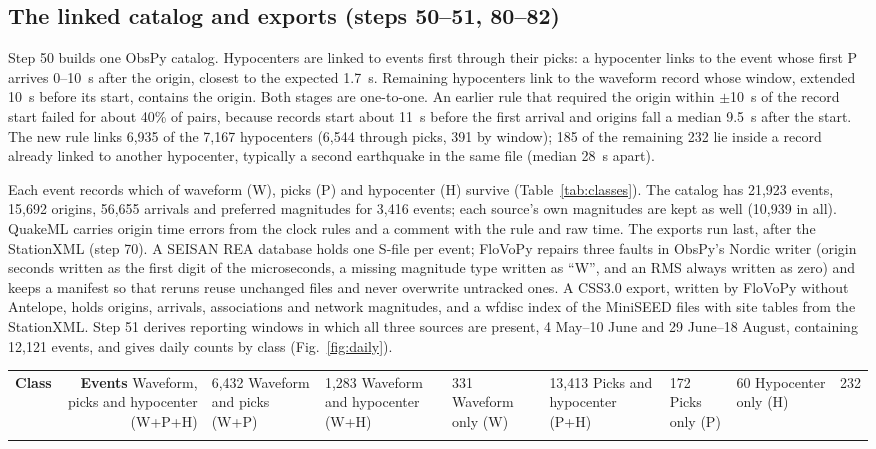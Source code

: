 \documentclass[linenum]{SSA-SRL}
\begin{document}
\subsection{The linked catalog and exports (steps 50--51, 80--82)}

Step 50 builds one ObsPy catalog. Hypocenters are linked to events first through their picks: a hypocenter links to the event whose first P arrives 0--10~s after the origin, closest to the expected 1.7~s. Remaining hypocenters link to the waveform record whose window, extended 10~s before its start, contains the origin. Both stages are one-to-one. An earlier rule that required the origin within $\pm$10~s of the record start failed for about 40\% of pairs, because records start about 11~s before the first arrival and origins fall a median 9.5~s after the start. The new rule links 6,935 of the 7,167 hypocenters (6,544 through picks, 391 by window); 185 of the remaining 232 lie inside a record already linked to another hypocenter, typically a second earthquake in the same file (median 28~s apart).

Each event records which of waveform (W), picks (P) and hypocenter (H) survive (Table~\ref{tab:classes}). The catalog has 21,923 events, 15,692 origins, 56,655 arrivals and preferred magnitudes for 3,416 events; each source's own magnitudes are kept as well (10,939 in all). QuakeML \citep{Schorlemmer_2011} carries origin time errors from the clock rules and a comment with the rule and raw time. The exports run last, after the StationXML (step 70). A SEISAN REA database holds one S-file per event; FloVoPy repairs three faults in ObsPy's Nordic writer (origin seconds written as the first digit of the microseconds, a missing magnitude type written as ``W'', and an RMS always written as zero) and keeps a manifest so that reruns reuse unchanged files and never overwrite untracked ones. A CSS3.0 export, written by FloVoPy without Antelope, holds origins, arrivals, associations and network magnitudes, and a wfdisc index of the MiniSEED files with site tables from the StationXML. Step 51 derives reporting windows in which all three sources are present, 4 May--10 June and 29 June--18 August, containing 12,121 events, and gives daily counts by class (Fig.~\ref{fig:daily}).

\begin{table}
{\begin{tabular*}{\columnwidth}{@{\extracolsep{\fill}}lr@{}}
\toprule
\textbf{Class} & \textbf{Events} \trowsep
Waveform, picks and hypocenter (W+P+H) & 6,432 \trowsep
Waveform and picks (W+P) & 1,283 \trowsep
Waveform and hypocenter (W+H) & 331 \trowsep
Waveform only (W) & 13,413 \trowsep
Picks and hypocenter (P+H) & 172 \trowsep
Picks only (P) & 60 \trowsep
Hypocenter only (H) & 232 \\
\botrule
\end{tabular*}}
{}
\end{table}
\end{document}
